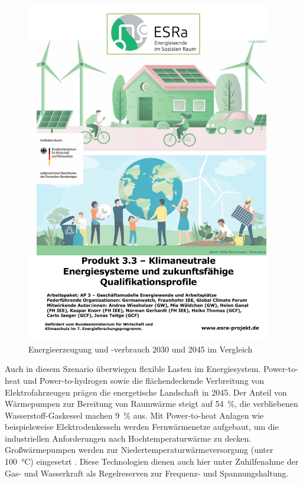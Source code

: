 		\begin{figure} [H]
			\centering
			\label{Abb. Energiesystem 2045} 
			\includegraphics[page=17,trim=45 210 45 90, clip, width=0.95\textwidth]{./anhang/Frauenhofer Studie.pdf}
			\caption{Energieerzeugung und -verbrauch 2030 und 2045 im Vergleich \cite[S.9]{ESRa_Fraunhofer}}
		\end{figure}
	
		Auch in diesem Szenario überwiegen flexible Lasten im Energiesystem. 
		Power-to-heat und Power-to-hydrogen sowie die flächendeckende Verbreitung von Elektrofahrzeugen prägen die energetische Landschaft in 2045.
		Der Anteil von Wärmepumpen zur Bereitung von Raumwärme steigt auf \SI{54}{\percent}, die verbliebenen Wasserstoff-Gaskessel machen \SI{9}{\percent} aus. 
		Mit Power-to-heat Anlagen wie beispielsweise Elektrodenkesseln werden Fernwärmenetze aufgebaut, um die industriellen Anforderungen nach Hochtemperaturwärme zu decken.
		Großwärmepumpen werden zur Niedertemperaturwärmeversorgung (unter \SI{100}{\degreeCelsius}) eingesetzt \cite[S.10ff]{ESRa_Fraunhofer}.
		Diese Technologien dienen auch hier unter Zuhilfenahme der Gas- und Wasserkraft als Regelreserven zur Frequenz- und Spannungshaltung.
		
